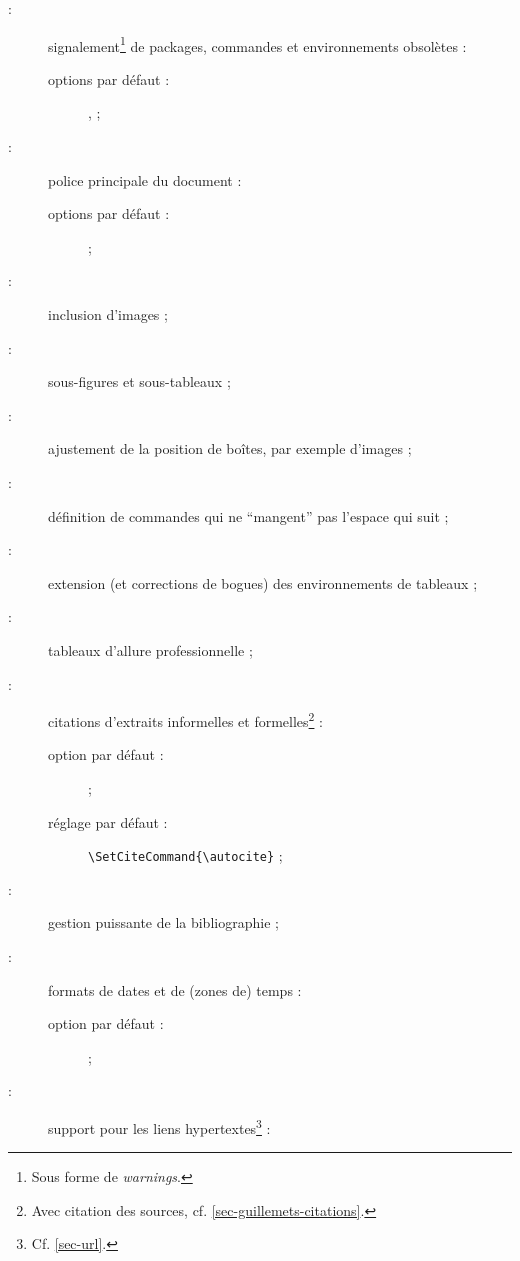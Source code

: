 \documentclass[french,nolocaltoc]{nwejmart}
\newtheorem[style=definition]{fait}
\newtheorem[title=contraventionnalisation]{ctrv}
\newtheorem[title-plural=anneaux]{anneau}
\newtheorem[title-plural=idéaux]{idéal}
\begin{document}
\begin{description}
\item[ :] signalement\footnote{Sous forme de \emph{warnings}.} de
  packages, commandes et environnements obsolètes :
  \begin{description}
  \item[options par défaut :] ,  ;
  \end{description}
\item[ :] police principale du document :
  \begin{description}
  \item[options par défaut :]  ;
  \end{description}
\item[ :] inclusion d'images ;
\item[ :] sous-figures et sous-tableaux ;
\item[ :] ajustement de la position de boîtes, par exemple
  d'images ;
\item[ :] définition de commandes qui ne \enquote{mangent} pas
  l'espace qui suit ;
\item[ :] extension (et corrections de bogues) des
  environnements de tableaux ;
\item[ :] tableaux d'allure professionnelle ;
\item[ :] citations d'extraits informelles et
  formelles\footnote{Avec citation des sources,
    cf. \vref{sec-guillemets-citations}.} :
  \begin{description}
  \item[option par défaut :]  ;
  \item[réglage par défaut :]
    \lstinline[alsolanguage={[csquotes]TeX},alsolanguage={[biblatex]TeX}]×\SetCiteCommand{\autocite}× ;
  \end{description}
\item[ :] gestion puissante de la bibliographie ;
\item[ :] formats de dates et de (zones de) temps :
  \begin{description}
  \item[option par défaut :]  ;
  \end{description}
\item[ :] support pour les liens
  hypertextes\footnote{Cf. \vref{sec-url}.} :

\end{description}
\end{document}
